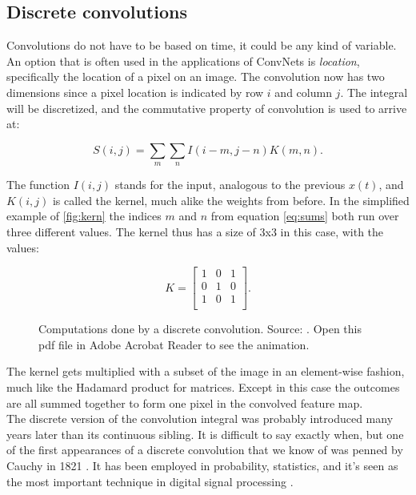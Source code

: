 \subsection{Discrete convolutions}

Convolutions do not have to be based on time, it could be any kind of variable. An option that is often used in the applications of ConvNets is \textit{location}, specifically the location of a pixel on an image. The convolution now has two dimensions since a pixel location is indicated by row $i$ and column $j$. The integral will be discretized, and the commutative property of convolution is used to arrive at:

\begin{equation}\label{eq:sums}
    S(i,j) = \sum_m \sum_n I(i-m,j-n)K(m,n).
\end{equation}

The function $I(i,j)$ stands for the input, analogous to the previous $x(t)$, and $K(i,j)$ is called the kernel, much alike the weights from before. In the simplified example of \autoref{fig:kern} the indices $m$ and $n$ from equation \eqref{eq:sums} both run over three different values. The kernel thus has a size of 3x3 in this case, with the values:

\begin{equation*}
    K = 
    \begin{bmatrix}
        1 & 0 & 1 \\
        0 & 1 & 0 \\
        1 & 0 & 1 \\
    \end{bmatrix}.
\end{equation*}

\begin{figure}
    \centering
    \caption{Computations done by a discrete convolution. Source: \cite{stanf}. Open this pdf file in Adobe Acrobat Reader to see the animation.}
    \label{fig:kern}
\end{figure}

The kernel gets multiplied with a subset of the image in an element-wise fashion, much like the Hadamard product for matrices. Except in this case the outcomes are all summed together to form one pixel in the convolved feature map.\\

The discrete version of the convolution integral was probably introduced many years later than its continuous sibling. It is difficult to say exactly when, but one of the first appearances of a discrete convolution that we know of was penned by Cauchy in 1821 \cite{tor}. It has been employed in probability, statistics, and it's seen as the most important technique in digital signal processing \cite[Ch. 6]{dsp}.\\

